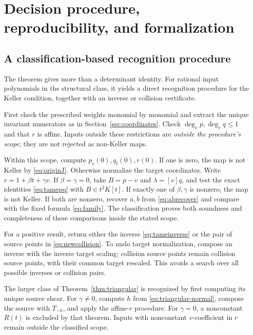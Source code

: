 \documentclass[11pt,a4paper]{article}
\numberwithin{equation}{section}
\theoremstyle{definition}
\theoremstyle{remark}
\newcommand{\coeff}[2]{[#1]#2}
\begin{document}
\section{Decision procedure, reproducibility, and formalization}
\label{sec:verification}

\subsection{A classification-based recognition procedure}

The theorem gives more than a determinant identity. For rational input
polynomials in the structural class, it yields a direct recognition
procedure for the Keller condition, together with an inverse or collision
certificate.

First check the prescribed weights monomial by monomial and extract the
unique invariant numerators as in Section~\ref{sec:coordinates}. Check
$\deg_vp,\deg_vq\le1$ and that $r$ is affine. Inputs outside these
restrictions are \emph{outside the procedure's scope}; they are not
rejected as non-Keller maps.

Within this scope, compute $p_v(0),q_t(0),r(0)$. If one is zero, the map
is not Keller by \eqref{eq:originJ}. Otherwise normalize the target
coordinates. Write $r=1+\beta t+\gamma v$. If $\beta=\gamma=0$, take
$B=p-v$ and $\lambda=\coeff{v}{q}$, and test the exact identities
\eqref{eq:tamepq} with $B\in t^2K[t]$. If exactly one of $\beta,\gamma$
is nonzero, the map is not Keller. If both are nonzero, recover $a,b$ from
\eqref{eq:abrecover} and compare with the fixed formula
\eqref{eq:family}. The classification proves both soundness and completeness
of these comparisons inside the stated scope.

For a positive result, return either the inverse
\eqref{eq:tameinverse} or the pair of source points in
\eqref{eq:newcollision}. To undo target normalization, compose an inverse
with the inverse target scaling; collision source points remain collision
source points, with their common target rescaled. This avoids a search over
all possible inverses or collision pairs.

The larger class of Theorem~\ref{thm:triangular} is recognized by first
computing its unique source shear. For $\gamma\ne0$, compute $h$ from
\eqref{eq:triangular-normal}, compose the source with $T_{-h}$, and apply
the affine-$r$ procedure. For $\gamma=0$, a nonconstant $R(t)$ is excluded
by that theorem. Inputs with nonconstant $v$-coefficient in $r$ remain
outside the classified scope.
\end{document}
